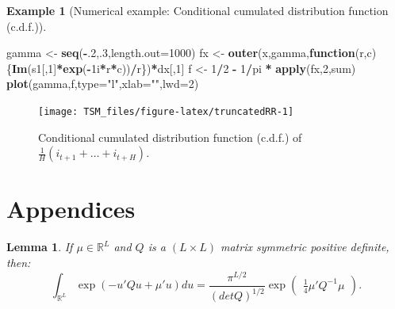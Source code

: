 \documentclass[
  12pt,
]{book}
\newenvironment{Shaded}{\begin{snugshade}}{\end{snugshade}}
\newcommand{\AttributeTok}[1]{\textcolor[rgb]{0.13,0.29,0.53}{#1}}
\newcommand{\ControlFlowTok}[1]{\textcolor[rgb]{0.13,0.29,0.53}{\textbf{#1}}}
\newcommand{\DecValTok}[1]{\textcolor[rgb]{0.00,0.00,0.81}{#1}}
\newcommand{\FunctionTok}[1]{\textcolor[rgb]{0.13,0.29,0.53}{\textbf{#1}}}
\newcommand{\NormalTok}[1]{#1}
\newcommand{\OtherTok}[1]{\textcolor[rgb]{0.56,0.35,0.01}{#1}}
\newcommand{\SpecialCharTok}[1]{\textcolor[rgb]{0.81,0.36,0.00}{\textbf{#1}}}
\newcommand{\StringTok}[1]{\textcolor[rgb]{0.31,0.60,0.02}{#1}}
\newtheorem{lemma}{Lemma}[chapter]
\theoremstyle{definition}
\theoremstyle{definition}
\newtheorem{example}{Example}[chapter]
\theoremstyle{definition}
\theoremstyle{definition}
\theoremstyle{remark}
\begin{document}
\begin{example}[Numerical example: Conditional cumulated distribution function (c.d.f.)]
\begin{Shaded}
\begin{Highlighting}[]
\NormalTok{gamma }\OtherTok{\textless{}{-}} \FunctionTok{seq}\NormalTok{(}\SpecialCharTok{{-}}\NormalTok{.}\DecValTok{2}\NormalTok{,.}\DecValTok{3}\NormalTok{,}\AttributeTok{length.out=}\DecValTok{1000}\NormalTok{)}
\NormalTok{fx }\OtherTok{\textless{}{-}} \FunctionTok{outer}\NormalTok{(x,gamma,}\ControlFlowTok{function}\NormalTok{(r,c)\{}\FunctionTok{Im}\NormalTok{(s1[,}\DecValTok{1}\NormalTok{]}\SpecialCharTok{*}\FunctionTok{exp}\NormalTok{(}\SpecialCharTok{{-}}\NormalTok{1i}\SpecialCharTok{*}\NormalTok{r}\SpecialCharTok{*}\NormalTok{c))}\SpecialCharTok{/}\NormalTok{r\})}\SpecialCharTok{*}\NormalTok{dx[,}\DecValTok{1}\NormalTok{]}
\NormalTok{f  }\OtherTok{\textless{}{-}} \DecValTok{1}\SpecialCharTok{/}\DecValTok{2} \SpecialCharTok{{-}} \DecValTok{1}\SpecialCharTok{/}\NormalTok{pi }\SpecialCharTok{*} \FunctionTok{apply}\NormalTok{(fx,}\DecValTok{2}\NormalTok{,sum)}
\FunctionTok{plot}\NormalTok{(gamma,f,}\AttributeTok{type=}\StringTok{"l"}\NormalTok{,}\AttributeTok{xlab=}\StringTok{""}\NormalTok{,}\AttributeTok{lwd=}\DecValTok{2}\NormalTok{)}
\end{Highlighting}
\end{Shaded}

\begin{figure}
\texttt{[image: TSM\_files/figure-latex/truncatedRR-1]} \caption{Conditional cumulated distribution function (c.d.f.) of $\frac{1}{H}(i_{t+1}+\dots+i_{t+H})$.}\label{fig:truncatedRR}
\end{figure}

\end{example}

\hypertarget{appendices}{%
\section{Appendices}\label{appendices}}

\begin{lemma}
\protect\hypertarget{lem:integralQuadratic}{}\label{lem:integralQuadratic}If \(\mu \in \mathbb{R}^L\) and \(Q\) is a \((L \times L)\) matrix symmetric positive definite, then:
\[
\int_{\mathbb{R}^{L}} \exp(-u'Q u + \mu'u)du =
\frac{\pi^{L/2}}{(det   Q)^{1/2}} \exp \left(
\begin{array}{l}  \frac{1}{4} \mu'Q^{-1}\mu \end{array} \right).
\]
\end{lemma}
\end{document}
